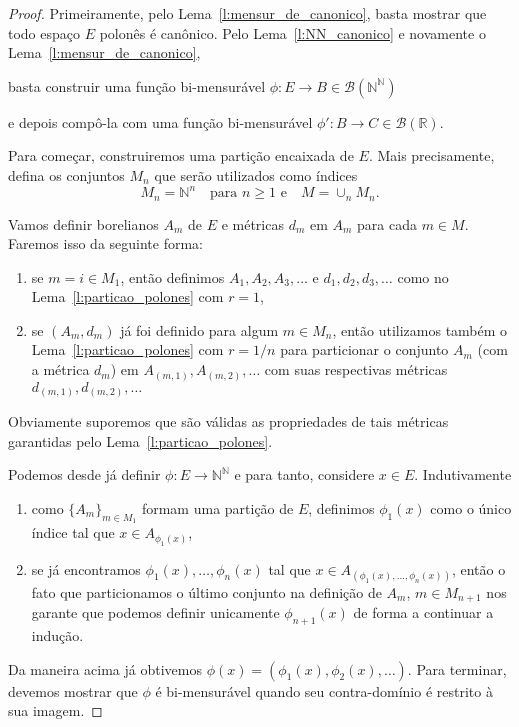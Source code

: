 \begin{proof}
  Primeiramente, pelo Lema~\ref{l:mensur_de_canonico}, basta mostrar que todo espaço $E$ polonês é canônico.
  Pelo Lema~\ref{l:NN_canonico} e novamente o Lema~\ref{l:mensur_de_canonico},
  \begin{display}
    basta construir uma função bi-mensurável $\phi:E \to B \in \mathcal{B}(\mathbb{N}^\mathbb{N})$
  \end{display}
  e depois compô-la com uma função bi-mensurável $\phi': B \to C \in \mathcal{B}(\mathbb{R})$.

  Para começar, construiremos uma partição encaixada de $E$.
  Mais precisamente, defina os conjuntos $M_n$ que serão utilizados como índices
  \begin{equation}
    M_n = \mathbb{N}^n \quad \text{para $n \geq 1$ e} \quad M = \cup_n M_n.
  \end{equation}

  Vamos definir borelianos $A_m$ de $E$ e métricas $d_m$ em $A_m$ para cada $m \in M$.
  Faremos isso da seguinte forma:
  \begin{enumerate}[\quad a)]
  \item se $m = i \in M_1$, então definimos $A_1, A_2, A_3, \dots$ e $d_1, d_2, d_3, \dots$ como no Lema~\ref{l:particao_polones} com $r = 1$,
  \item se $(A_m, d_m)$ já foi definido para algum $m \in M_n$, então utilizamos também o Lema~\ref{l:particao_polones} com $r = 1/n$ para particionar o conjunto $A_m$ (com a métrica $d_m$) em $A_{(m,1)}, A_{(m,2)}, \dots$ com suas respectivas métricas $d_{(m,1)}, d_{(m,2)}, \dots$
  \end{enumerate}
  Obviamente suporemos que são válidas as propriedades de tais métricas garantidas pelo Lema~\ref{l:particao_polones}.

  Podemos desde já definir $\phi:E \to \mathbb{N}^\mathbb{N}$ e para tanto, considere $x \in E$.
  Indutivamente
  \begin{enumerate}[\quad a)]
  \item como $\{A_m\}_{m \in M_1}$ formam uma partição de $E$, definimos $\phi_1(x)$ como o único índice tal que $x \in A_{\phi_1(x)}$,
  \item se já encontramos $\phi_1(x), \dots, \phi_n(x)$ tal que $x \in A_{(\phi_1(x), \dots, \phi_n(x))}$, então o fato que particionamos o último conjunto na definição de $A_m$, $m \in M_{n+1}$ nos garante que podemos definir unicamente $\phi_{n+1}(x)$ de forma a continuar a indução.
  \end{enumerate}
  Da maneira acima já obtivemos $\phi(x) = (\phi_1(x), \phi_2(x), \dots)$.
  Para terminar, devemos mostrar que $\phi$ é bi-mensurável quando seu contra-domínio é restrito à sua imagem.


\end{proof}
